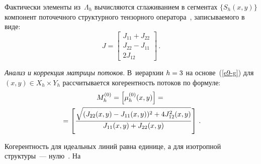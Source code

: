 \begin{multicols}{2}
  Фактически элементы из~$\Lambda_h$ вычисляются сглаживанием в 
сегментах $\{S_h(x,y)\}$ компонент поточечного структурного тензорного 
оператора~\cite{5-g}, записываемого в виде:
  \begin{equation}
  J=\begin{bmatrix}
  J_{11}+J_{22}\\
  J_{22}-J_{11}\\
  2J_{12}
  \end{bmatrix}\,.
  \label{e9-g}
  \end{equation}
  
  \textit{Анализ и коррекция матрицы потоков}. В~иерархии $h\hm=3$ на 
основе~(\ref{e9-g}) для $(x,y)\in X_h\times Y_h$ рассчитывается когерентность 
потоков по фор\-муле:
  \begin{multline}
  M_h^{(0)} =  \left[ \mu_h^{(0)}(x,y) \right] ={}\\
  {}=\left[ 
\displaystyle\frac{\displaystyle \sqrt{(J_{22}(x,y)-
J_{11}(x,y))^2+4J^2_{12}(x,y)}\mathstrut}{\displaystyle J_{11}(x,y)+J_{22}(x,y)\mathstrut}\right]\,.
  \label{e10-g}
  \end{multline}



  Когерентность для идеальных линий равна единице, а для изотропной 
структуры~--- нулю~\cite{5-g}. На\linebreak\vspace*{-12pt}
\pagebreak

\end{multicols}

\begin{figure} %
 \vspace*{1pt}
 \begin{center}
 \mbox{%
 \epsfxsize=161.898mm
 }
 \end{center}
 \vspace*{-9pt}
\end{figure}


